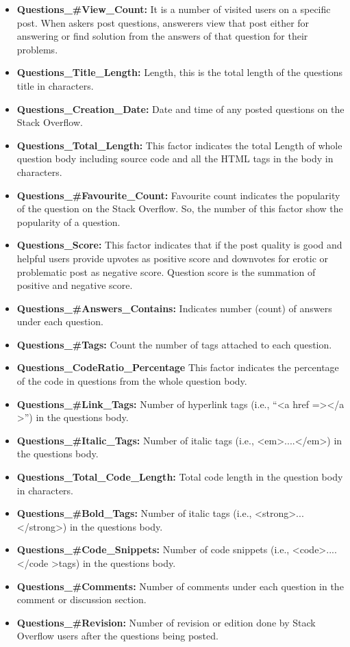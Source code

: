 \documentclass[conference]{IEEEtran}
\begin{document}
	\begin{itemize}
		\item \textbf{Questions\_\#View\_Count:} It is a number of visited users on a specific post.  When askers post questions, answerers view that post either for answering or find solution from the answers of that question for their problems. 
		\item \textbf{Questions\_Title\_Length:} Length, this is the total length of the questions title in characters.
		\item \textbf{Questions\_Creation\_Date:}  Date and time of any posted questions on the Stack Overflow.
		\item \textbf{Questions\_Total\_Length:} This factor indicates the total Length of whole question body including source code and all the HTML tags in the body in characters.   
		\item \textbf{Questions\_\#Favourite\_Count: } Favourite count indicates the popularity of the question on the Stack Overflow. So, the number of this factor show the popularity of a question.
		\item \textbf{Questions\_Score: } This factor indicates that if the post quality is good and helpful users provide upvotes as positive score and downvotes for erotic or problematic post as negative score. Question score is the summation of positive and negative score.
		\item \textbf{Questions\_\#Answers\_Contains: } Indicates number (count) of answers under each question.   
		\item \textbf{Questions\_\#Tags: } Count the number of tags attached to each question.
		\item \textbf{Questions\_CodeRatio\_Percentage} This factor indicates the percentage of the code in questions from the whole question body.  
		\item \textbf{Questions\_\#Link\_Tags: } Number of hyperlink tags (i.e., “\textless a href =\textgreater\textless /a \textgreater”) in the questions body.
		\item \textbf{Questions\_\#Italic\_Tags: }Number of italic tags (i.e., \textless em\textgreater....\textless /em\textgreater) in the questions body.
		\item \textbf{Questions\_Total\_Code\_Length: }Total code length in the question body in characters.
		\item \textbf{Questions\_\#Bold\_Tags: }Number of italic tags (i.e., \textless strong\textgreater...\textless/strong\textgreater) in the questions body.
		\item \textbf{Questions\_\#Code\_Snippets:} Number of code snippets (i.e., \textless code\textgreater....\textless/code \textgreater tags) in the questions body.
		\item \textbf{Questions\_\#Comments: } Number of comments under each question in the comment or discussion section. 
		\item \textbf{Questions\_\#Revision: } Number of revision or edition done by Stack Overflow users after the questions being posted.
	\end{itemize}
	
\end{document}
